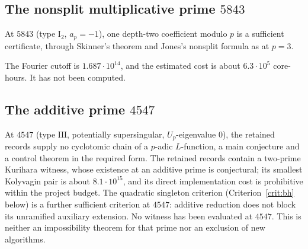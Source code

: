 \subsection{The nonsplit multiplicative prime $5843$}
\begin{criterion}\label{crit:5843}
At $5843$ (type $\mathrm{I}_2$, $a_p=-1$), one depth-two coefficient modulo $p$ is a sufficient certificate, through Skinner's theorem and Jones's nonsplit formula as at $p=3$.
\end{criterion}
The Fourier cutoff is $1.687\cdot10^{14}$, and the estimated cost is about $6.3\cdot10^5$ core-hours. It has not been computed.

\subsection{The additive prime $4547$}
\begin{remark}\label{prop:4547}
At $4547$ (type $\mathrm{III}$, potentially supersingular, $U_p$-eigenvalue $0$), the retained records supply no cyclotomic chain of a $p$-adic $L$-function, a main conjecture and a control theorem in the required form. The retained records contain a two-prime Kurihara witness, whose existence at an additive prime is conjectural; its smallest Kolyvagin pair is about $8.1\cdot10^{15}$, and its direct implementation cost is prohibitive within the project budget. The quadratic singleton criterion (Criterion~\ref{crit:bh} below) is a further sufficient criterion at $4547$: additive reduction does not block its unramified auxiliary extension. No witness has been evaluated at $4547$. This is neither an impossibility theorem for that prime nor an exclusion of new algorithms.
\end{remark}

